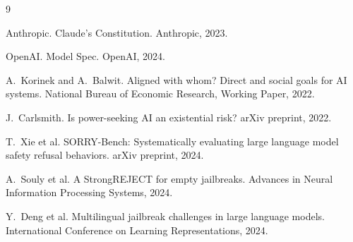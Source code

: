 \documentclass[11pt]{article}
\begin{document}
\begin{thebibliography}{9}

Anthropic.
\newblock Claude's Constitution.
\newblock Anthropic, 2023.

OpenAI.
\newblock Model Spec.
\newblock OpenAI, 2024.

A.~Korinek and A.~Balwit.
\newblock Aligned with whom? Direct and social goals for AI systems.
\newblock National Bureau of Economic Research, Working Paper, 2022.

J.~Carlsmith.
\newblock Is power-seeking AI an existential risk?
\newblock arXiv preprint, 2022.

T.~Xie et al.
\newblock SORRY-Bench: Systematically evaluating large language model safety
refusal behaviors.
\newblock arXiv preprint, 2024.

A.~Souly et al.
\newblock A StrongREJECT for empty jailbreaks.
\newblock Advances in Neural Information Processing Systems, 2024.

Y.~Deng et al.
\newblock Multilingual jailbreak challenges in large language models.
\newblock International Conference on Learning Representations, 2024.

\end{thebibliography}
\end{document}

